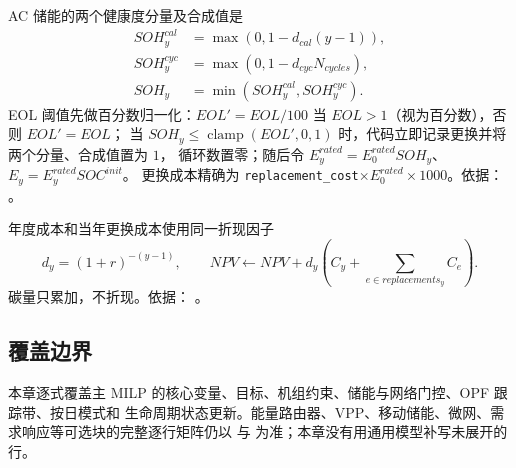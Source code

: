 AC 储能的两个健康度分量及合成值是
\begin{align}
 SOH_y^{cal}&=\max(0,1-d_{cal}(y-1)),\\
 SOH_y^{cyc}&=\max(0,1-d_{cyc}N_{cycles}),\\
 SOH_y&=\min(SOH_y^{cal},SOH_y^{cyc}).
\end{align}
EOL 阈值先做百分数归一化：$EOL'=EOL/100$ 当 $EOL>1$（视为百分数），否则 $EOL'=EOL$；
当 $SOH_y\le\operatorname{clamp}(EOL',0,1)$ 时，代码立即记录更换并将两个分量、合成值置为 $1$，
循环数置零；随后令 $E_y^{rated}=E_0^{rated}SOH_y$、$E_y=E_y^{rated}SOC^{init}$。
更换成本精确为 \texttt{replacement\_cost}$\times E_0^{rated}\times1000$。依据：
。

年度成本和当年更换成本使用同一折现因子
\begin{equation}
 d_y=(1+r)^{-(y-1)},\qquad
 NPV\leftarrow NPV+d_y\left(C_y+\sum_{e\in replacements_y}C_e\right).
\end{equation}
碳量只累加，不折现。依据：
。

\subsection{覆盖边界}
本章逐式覆盖主 MILP 的核心变量、目标、机组约束、储能与网络门控、OPF 跟踪带、按日模式和
生命周期状态更新。能量路由器、VPP、移动储能、微网、需求响应等可选块的完整逐行矩阵仍以
 与
 为准；本章没有用通用模型补写未展开的行。
